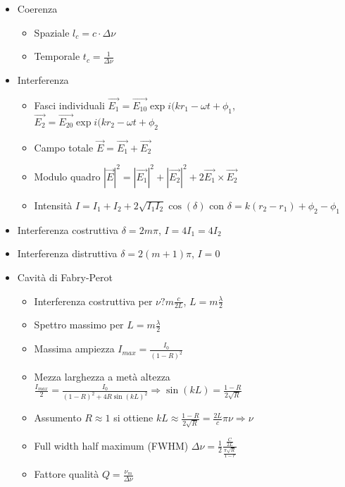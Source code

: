 \documentclass{article}
\begin{document}
\begin{itemize}
\begin{itemize}
	\end{itemize}
	\item Coerenza
	\begin{itemize}
		\item Spaziale \( l_c = c \cdot \Delta \nu \)
		\item Temporale \( t_c = \frac{1}{\Delta \nu} \)
	\end{itemize}
	\item Interferenza
	\begin{itemize}
		\item Fasci individuali \( \vec{E_1} = \vec{E_{10}} \exp{i (k r_1 - \omega t + \phi_1} \), \( \vec{E_2} = \vec{E_{20}} \exp{i (k r_2 - \omega t + \phi_2} \)
		\item Campo totale \( \vec{E} = \vec{E_1} + \vec{E_2} \)
		\item Modulo quadro \( |\vec{E}| ^ 2 = |\vec{E_1}| ^ 2 + |\vec{E_2}| ^ 2 + 2 \vec{E_1} \times \vec{E_2} \)
		\item Intensità \( I = I_1 + I_2 + 2 \sqrt{I_1 I_2} \cos(\delta) \) con \( \delta = k(r_2 - r_1) + \phi_2 - \phi_1 \)
	\end{itemize}
	\item Interferenza costruttiva \( \delta = 2m\pi\), \(I = 4 I_1 = 4 I_2 \)
	\item Interferenza distruttiva \( \delta = 2(m + 1)\pi\), \(I = 0 \)
	\item Cavità di Fabry-Perot
	\begin{itemize}
		\item Interferenza costruttiva per \( \nu ? m \frac{c}{2L} \), \(L = m \frac{\lambda}{2} \)
		\item Spettro massimo per \( L = m \frac{\lambda}{2} \)
		\item Massima ampiezza \( I_{max} = \frac{I_0}{(1-R)^2} \)
		\item Mezza larghezza a metà altezza \( \frac{I_{max}}{2} = \frac{I_0}{(1- R)^2 + 4 R \sin(k L) ^ 2} \Rightarrow \sin(k L) = \frac{1 - R}{2 \sqrt{R}}\)
		\item Assumento \( R \approx 1 \) si ottiene \( kL \approx \frac{1 - R}{2 \sqrt{R}} = \frac{2L}{c} \pi \nu \Rightarrow \nu \)
		\item Full width half maximum (FWHM) \( \Delta \nu  = \frac{1}{2} \frac{\frac{C}{2L}}{\frac{\pi \sqrt{R}}{1 - r}} \)
		\item Fattore qualità \( Q = \frac{\nu_m}{\Delta \nu} \)
	\end{itemize}	 
\end{itemize}
\end{document}
